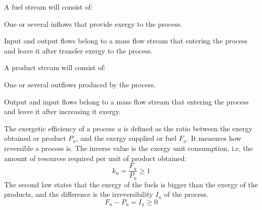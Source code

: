 \documentclass{ecos2018}
\begin{document}
A fuel stream will consist of:
\begin{elist}
	\item One or several inflows that provide exergy to the process.
	\item Input and output flows belong to a mass flow stream that entering the process and leave it after transfer exergy to the process.
\end{elist}
A product stream will consist of:
\begin{elist}
	\item One or several outflows produced by the process.
	\item Output and input flows belong to a mass flow stream that entering the process and leave it after increasing it exergy.
\end{elist}

The exergetic efficiency of a process $u$ is defined as the ratio between the exergy obtained or product $P_u$, and the exergy supplied or fuel $F_u$. It measures how reversible a process is. The inverse value is the exergy unit consumption, i.e, the amount of resources required per unit of product obtained:
\begin{equation}
k_u=\frac{F_u}{P_u} \ge 1
\end{equation}
The second law states that the exergy of the fuels is bigger than the exergy of the products, and the difference is the irreversibility $I_u$ of the process.
\begin{equation}
\label{eq:fpi}
F_u - P_u = I_u \ge 0
\end{equation}
\end{document}
